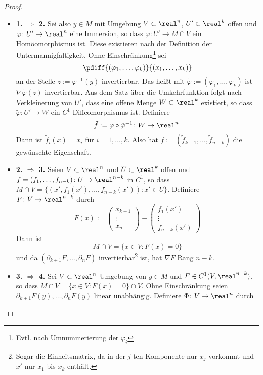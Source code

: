 \documentclass[
 a4paper,
 12pt,
 parskip=half
 ]{scrartcl}
\theoremstyle{plain}
\theoremstyle{definition}
\numberwithin{equation}{section}
\begin{document}
\begin{proof}
 \begin{itemize}
  \item \textbf{1. $\Rightarrow$ 2.} Sei also $y \in M$ mit Umgebung $V \subset \real^n$, $U' \subset \real^k$ offen und $\varphi\colon U' \to \real^n$ eine Immersion, so dass $\varphi\colon U' \to M \cap V$ ein Homöomorphismus ist. Diese existieren nach der Definition der Untermannigfaltigkeit. Ohne Einschränkung\footnote{Evtl. nach Umnummerierung der $\varphi_i$} sei
  \[ \pdiff{ (\varphi_1, \ldots, \varphi_k) }{ (x_1, \ldots, x_k) } \]
  an der Stelle $z := \varphi^{-1}(y)$ invertierbar. Das heißt mit $\tilde{\varphi}:=( \varphi_1, \ldots, \varphi_k)$ ist $\nabla \tilde{\varphi}(z)$ invertierbar. Aus dem Satz über die Umkehrfunktion folgt nach Verkleinerung von $U'$, dass eine offene Menge $W \subset \real^k$ existiert, so dass $\tilde{\varphi}\colon U' \to W$ ein $C^1$-Diffeomorphismus ist. Definiere
  \[ \tilde{f} :=\varphi \circ \tilde{\varphi}^{-1} \colon W \to \real^n. \]
  Dann ist $\tilde{f}_i(x) = x_i$ für $i = 1, \ldots, k$. Also hat $f := (\tilde{f}_{k+1}, \ldots, \tilde{f}_{n-k})$ die gewünschte Eigenschaft.
  \item \textbf{2. $\Rightarrow$ 3.} Seien $V \subset \real^n$ und $U \subset \real^k$ offen und $f = (f_1, \ldots, f_{n-k})\colon U \to \real^{n-k}$ in $C^1$, so dass $M \cap V = \{ (x', f_1(x'), \ldots, f_{n-k}(x') ) : x' \in U \}$. Definiere $F\colon V \to \real^{n-k}$ durch 
  \[ 
  F(x) := \begin{pmatrix}  x_{k+1}         \\ \vdots\\ x_n             \end{pmatrix}
  -       \begin{pmatrix}           f_1(x')\\ \vdots\\     f_{n-k}(x') \end{pmatrix}
  \]
  Dann ist 
  \[ M \cap V = \{ x \in V : F(x) = 0 \} \]
  und da $(\partial_{k+1} F, \ldots, \partial_n F)$ invertierbar\footnote{Sogar die Einheitsmatrix, da in der $j$-ten Komponente nur $x_j$ vorkommt und $x'$ nur $x_1$ bis $x_k$ enthält.} ist, hat $\nabla F$ Rang $n-k$.
  \item \textbf{3. $\Rightarrow$ 4.} Sei $V \subset \real^n$ Umgebung von $y \in M$ und $F \in C^1(V, \real^{n-k})$, so dass $M \cap V = \{ x \in V : F(x)=0 \} \cap V$. Ohne Einschränkung seien $\partial_{k+1} F(y), \ldots, \partial_n F(y)$ linear unabhängig. Definiere $\Phi\colon V \to \real^n$ durch

\end{itemize}
\end{proof}
\end{document}
